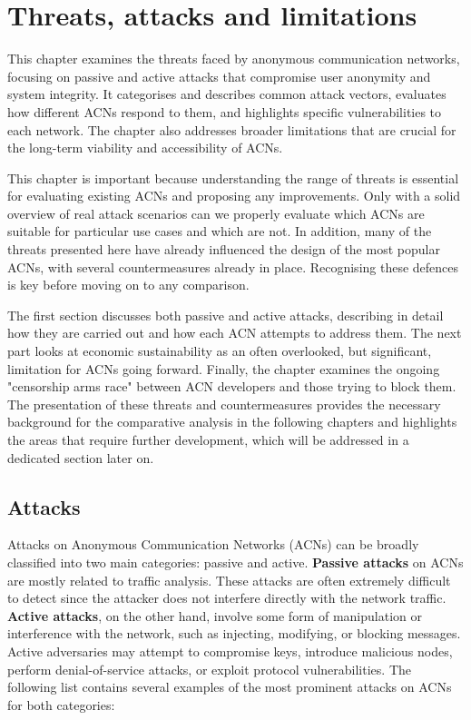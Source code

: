 \chapter{Threats, attacks and limitations}
\label{chap:Threats}

This chapter examines the threats faced by anonymous communication networks, focusing on passive and active attacks that compromise user anonymity and system integrity. It categorises and describes common attack vectors, evaluates how different ACNs respond to them, and highlights specific vulnerabilities to each network. The chapter also addresses broader limitations that are crucial for the long-term viability and accessibility of ACNs.

This chapter is important because understanding the range of threats is essential for evaluating existing ACNs and proposing any improvements. Only with a solid overview of real attack scenarios can we properly evaluate which ACNs are suitable for particular use cases and which are not. In addition, many of the threats presented here have already influenced the design of the most popular ACNs, with several countermeasures already in place. Recognising these defences is key before moving on to any comparison.

The first section discusses both passive and active attacks, describing in detail how they are carried out and how each ACN attempts to address them. The next part looks at economic sustainability as an often overlooked, but significant, limitation for ACNs going forward. Finally, the chapter examines the ongoing "censorship arms race" between ACN developers and those trying to block them. The presentation of these threats and countermeasures provides the necessary background for the comparative analysis in the following chapters and highlights the areas that require further development, which will be addressed in a dedicated section later on.

\section{Attacks}

Attacks on Anonymous Communication Networks (ACNs) can be broadly classified into two main categories: passive and active. \textbf{Passive attacks} on ACNs are mostly related to traffic analysis. These attacks are often extremely difficult to detect since the attacker does not interfere directly with the network traffic. \textbf{Active attacks}, on the other hand, involve some form of manipulation or interference with the network, such as injecting, modifying, or blocking messages. Active adversaries may attempt to compromise keys, introduce malicious nodes, perform denial-of-service attacks, or exploit protocol vulnerabilities. The following list contains several examples of the most prominent attacks on ACNs for both categories:

